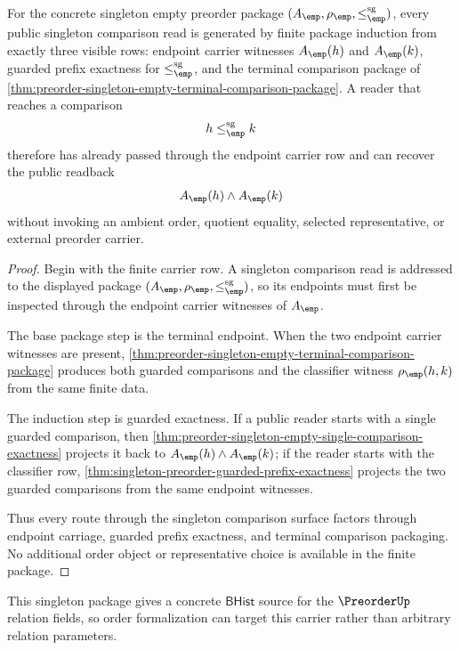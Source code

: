 \begin{theorem}
\label{thm:preorder-finite-comparison-induction}
For the concrete singleton empty preorder package
$(A_{\emp},\rho_{\emp},\le_{\emp}^{\mathrm{sg}})$, every public singleton
comparison read is generated by finite package induction from exactly three
visible rows: endpoint carrier witnesses $A_{\emp}(h)$ and $A_{\emp}(k)$,
guarded prefix exactness for $\le_{\emp}^{\mathrm{sg}}$, and the terminal
comparison package of
\autoref{thm:preorder-singleton-empty-terminal-comparison-package}. A reader
that reaches a comparison
$$
h\le_{\emp}^{\mathrm{sg}}k
$$
therefore has already passed through the endpoint carrier row and can recover
the public readback
$$
A_{\emp}(h)\land A_{\emp}(k)
$$
without invoking an ambient order, quotient equality, selected representative,
or external preorder carrier.
\end{theorem}
\begin{proof}
Begin with the finite carrier row. A singleton comparison read is addressed to
the displayed package $(A_{\emp},\rho_{\emp},\le_{\emp}^{\mathrm{sg}})$, so its
endpoints must first be inspected through the endpoint carrier witnesses of
$A_{\emp}$.

The base package step is the terminal endpoint. When the two endpoint carrier
witnesses are present,
\autoref{thm:preorder-singleton-empty-terminal-comparison-package} produces
both guarded comparisons and the classifier witness $\rho_{\emp}(h,k)$ from
the same finite data.

The induction step is guarded exactness. If a public reader starts with a
single guarded comparison, then
\autoref{thm:preorder-singleton-empty-single-comparison-exactness} projects it
back to $A_{\emp}(h)\land A_{\emp}(k)$; if the reader starts with the
classifier row, \autoref{thm:singleton-preorder-guarded-prefix-exactness}
projects the two guarded comparisons from the same endpoint witnesses.

Thus every route through the singleton comparison surface factors through
endpoint carriage, guarded prefix exactness, and terminal comparison packaging.
No additional order object or representative choice is available in the finite
package.
\end{proof}

This singleton package gives a concrete $\mathsf{BHist}$ source for the
$\PreorderUp$ relation fields, so order formalization can target this carrier
rather than arbitrary relation parameters.
